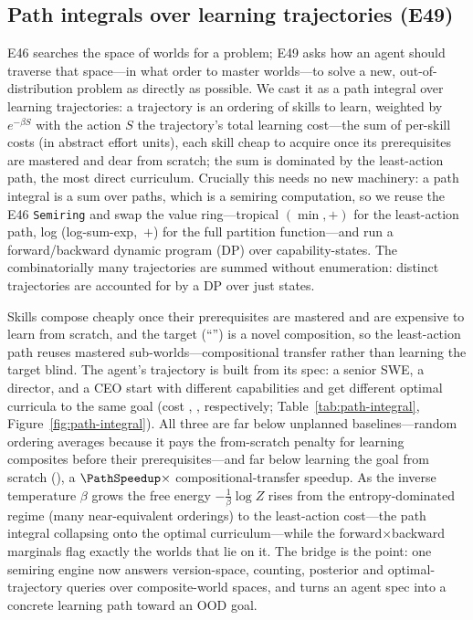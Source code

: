 \documentclass[11pt]{article}
\begin{document}
\subsection{Path integrals over learning trajectories (E49)}\label{sec:path-integral}
E46 searches the space of worlds for a problem; E49 asks how an agent should
traverse that space---in what order to master worlds---to solve a new,
out-of-distribution problem as directly as possible. We cast it as a path
integral over learning trajectories: a trajectory is an ordering of skills to
learn, weighted by $e^{-\beta S}$ with the action $S$ the trajectory's total
learning cost---the sum of per-skill costs (in abstract effort units), each skill
cheap to acquire once its prerequisites are mastered and dear from scratch; the
sum is dominated by the least-action path, the most direct curriculum. Crucially
this needs no new machinery: a path integral is a sum over paths, which is
a semiring computation, so we reuse the E46 \texttt{Semiring} and swap the value
ring---tropical $(\min,+)$ for the least-action path, log (log-sum-exp,~$+$) for
the full partition function---and run a forward/backward dynamic program (DP) over
capability-states. The combinatorially many trajectories are summed
without enumeration: \PathTraj{} distinct trajectories are accounted for by
a DP over just \PathStates{} states.

Skills compose cheaply once their prerequisites are mastered and are expensive to
learn from scratch, and the target (``\PathGoal'') is a novel composition,
so the least-action path reuses mastered sub-worlds---compositional transfer
rather than learning the target blind. The agent's trajectory is built
from its spec: a senior SWE, a director, and a CEO start with different
capabilities and get different optimal curricula to the same goal (cost
\PathSweCost{}, \PathDirCost{}, \PathCeoCost{} respectively;
Table~\ref{tab:path-integral}, Figure~\ref{fig:path-integral}). All three are
far below unplanned baselines---random ordering averages \PathRandom{} because it
pays the from-scratch penalty for learning composites before their
prerequisites---and far below learning the goal from scratch (\PathScratch{}), a
$\PathSpeedup\times$ compositional-transfer speedup. As the inverse temperature
$\beta$ grows the free energy $-\tfrac1\beta\log Z$ rises from the
entropy-dominated regime (many near-equivalent orderings) to the least-action
cost---the path integral collapsing onto the optimal curriculum---while the
forward$\times$backward marginals flag exactly the worlds that lie on it. The
bridge is the point: one semiring engine now answers version-space, counting,
posterior and optimal-trajectory queries over composite-world spaces, and
turns an agent spec into a concrete learning path toward an OOD goal.
\end{document}
